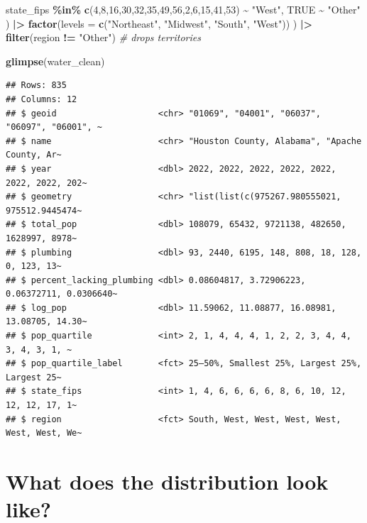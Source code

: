 \documentclass[
]{article}
\newenvironment{Shaded}{\begin{snugshade}}{\end{snugshade}}
\newcommand{\AttributeTok}[1]{\textcolor[rgb]{0.13,0.29,0.53}{#1}}
\newcommand{\CommentTok}[1]{\textcolor[rgb]{0.56,0.35,0.01}{\textit{#1}}}
\newcommand{\ConstantTok}[1]{\textcolor[rgb]{0.56,0.35,0.01}{#1}}
\newcommand{\DecValTok}[1]{\textcolor[rgb]{0.00,0.00,0.81}{#1}}
\newcommand{\FunctionTok}[1]{\textcolor[rgb]{0.13,0.29,0.53}{\textbf{#1}}}
\newcommand{\NormalTok}[1]{#1}
\newcommand{\SpecialCharTok}[1]{\textcolor[rgb]{0.81,0.36,0.00}{\textbf{#1}}}
\newcommand{\StringTok}[1]{\textcolor[rgb]{0.31,0.60,0.02}{#1}}
\begin{document}
\begin{Shaded}
\begin{Highlighting}[]
\NormalTok{      state\_fips }\SpecialCharTok{\%in\%} \FunctionTok{c}\NormalTok{(}\DecValTok{4}\NormalTok{,}\DecValTok{8}\NormalTok{,}\DecValTok{16}\NormalTok{,}\DecValTok{30}\NormalTok{,}\DecValTok{32}\NormalTok{,}\DecValTok{35}\NormalTok{,}\DecValTok{49}\NormalTok{,}\DecValTok{56}\NormalTok{,}\DecValTok{2}\NormalTok{,}\DecValTok{6}\NormalTok{,}\DecValTok{15}\NormalTok{,}\DecValTok{41}\NormalTok{,}\DecValTok{53}\NormalTok{) }\SpecialCharTok{\textasciitilde{}} \StringTok{"West"}\NormalTok{,}
      \ConstantTok{TRUE} \SpecialCharTok{\textasciitilde{}} \StringTok{"Other"}
\NormalTok{    ) }\SpecialCharTok{|\textgreater{}} \FunctionTok{factor}\NormalTok{(}\AttributeTok{levels =} \FunctionTok{c}\NormalTok{(}\StringTok{"Northeast"}\NormalTok{, }\StringTok{"Midwest"}\NormalTok{, }\StringTok{"South"}\NormalTok{, }\StringTok{"West"}\NormalTok{))}
\NormalTok{  ) }\SpecialCharTok{|\textgreater{}}
  \FunctionTok{filter}\NormalTok{(region }\SpecialCharTok{!=} \StringTok{"Other"}\NormalTok{)   }\CommentTok{\# drops territories}

\FunctionTok{glimpse}\NormalTok{(water\_clean)}
\end{Highlighting}
\end{Shaded}

\begin{verbatim}
## Rows: 835
## Columns: 12
## $ geoid                    <chr> "01069", "04001", "06037", "06097", "06001", ~
## $ name                     <chr> "Houston County, Alabama", "Apache County, Ar~
## $ year                     <dbl> 2022, 2022, 2022, 2022, 2022, 2022, 2022, 202~
## $ geometry                 <chr> "list(list(c(975267.980555021, 975512.9445474~
## $ total_pop                <dbl> 108079, 65432, 9721138, 482650, 1628997, 8978~
## $ plumbing                 <dbl> 93, 2440, 6195, 148, 808, 18, 128, 0, 123, 13~
## $ percent_lacking_plumbing <dbl> 0.08604817, 3.72906223, 0.06372711, 0.0306640~
## $ log_pop                  <dbl> 11.59062, 11.08877, 16.08981, 13.08705, 14.30~
## $ pop_quartile             <int> 2, 1, 4, 4, 4, 1, 2, 2, 3, 4, 4, 3, 4, 3, 1, ~
## $ pop_quartile_label       <fct> 25–50%, Smallest 25%, Largest 25%, Largest 25~
## $ state_fips               <int> 1, 4, 6, 6, 6, 6, 8, 6, 10, 12, 12, 12, 17, 1~
## $ region                   <fct> South, West, West, West, West, West, West, We~
\end{verbatim}

\section{What does the distribution look
like?}\label{what-does-the-distribution-look-like}
\end{document}
